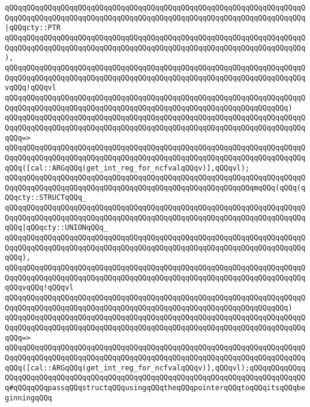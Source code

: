 \verb|qQQqqQQqqQQqqQQqqQQqqQQqqQQqqQQqqQQqqQQqqQQqqQQqqQQqqQQqqQQqqQQqqQQqqQQqqQQqqQQqqQQqqQQqqQQqqQQqqQQqqQQqqQQqqQQqqQQqqQQqqQQqqQQqqQQqqQQqqQQq|\verb#|qQQqcty::PTR#\newline
\verb|qQQqqQQqqQQqqQQqqQQqqQQqqQQqqQQqqQQqqQQqqQQqqQQqqQQqqQQqqQQqqQQqqQQqqQQqqQQqqQQqqQQqqQQqqQQqqQQqqQQqqQQqqQQqqQQqqQQqqQQqqQQqqQQqqQQqqQQqqQQq),|\newline
\verb|qQQqqQQqqQQqqQQqqQQqqQQqqQQqqQQqqQQqqQQqqQQqqQQqqQQqqQQqqQQqqQQqqQQqqQQqqQQqqQQqqQQqqQQqqQQqqQQqqQQqqQQqqQQqqQQqqQQqqQQqqQQqqQQqqQQqqQQqqQQqvqQQq!qQQqvl|\newline
\verb|qQQqqQQqqQQqqQQqqQQqqQQqqQQqqQQqqQQqqQQqqQQqqQQqqQQqqQQqqQQqqQQqqQQqqQQqqQQqqQQqqQQqqQQqqQQqqQQqqQQqqQQqqQQqqQQqqQQqqQQqqQQqqQQqqQQqqQQq)|\newline
\verb|qQQqqQQqqQQqqQQqqQQqqQQqqQQqqQQqqQQqqQQqqQQqqQQqqQQqqQQqqQQqqQQqqQQqqQQqqQQqqQQqqQQqqQQqqQQqqQQqqQQqqQQqqQQqqQQqqQQqqQQqqQQqqQQqqQQqqQQqqQQqqQQq=>|\newline
\verb|qQQqqQQqqQQqqQQqqQQqqQQqqQQqqQQqqQQqqQQqqQQqqQQqqQQqqQQqqQQqqQQqqQQqqQQqqQQqqQQqqQQqqQQqqQQqqQQqqQQqqQQqqQQqqQQqqQQqqQQqqQQqqQQqqQQqqQQqqQQqqQQq([cal::ARGqQQq(get_int_reg_for_ncfvalqQQqv)],qQQqvl);|\newline
\newline
\verb|qQQqqQQqqQQqqQQqqQQqqQQqqQQqqQQqqQQqqQQqqQQqqQQqqQQqqQQqqQQqqQQqqQQqqQQqqQQqqQQqqQQqqQQqqQQqqQQqqQQqqQQqqQQqqQQqqQQqqQQqqQQqqQQqmqQQq(qQQq(qQQqcty::STRUCTqQQq_|\newline
\verb|qQQqqQQqqQQqqQQqqQQqqQQqqQQqqQQqqQQqqQQqqQQqqQQqqQQqqQQqqQQqqQQqqQQqqQQqqQQqqQQqqQQqqQQqqQQqqQQqqQQqqQQqqQQqqQQqqQQqqQQqqQQqqQQqqQQqqQQqqQQqqQQq|\verb#|qQQqcty::UNIONqQQq_#\newline
\verb|qQQqqQQqqQQqqQQqqQQqqQQqqQQqqQQqqQQqqQQqqQQqqQQqqQQqqQQqqQQqqQQqqQQqqQQqqQQqqQQqqQQqqQQqqQQqqQQqqQQqqQQqqQQqqQQqqQQqqQQqqQQqqQQqqQQqqQQqqQQqqQQq),|\newline
\verb|qQQqqQQqqQQqqQQqqQQqqQQqqQQqqQQqqQQqqQQqqQQqqQQqqQQqqQQqqQQqqQQqqQQqqQQqqQQqqQQqqQQqqQQqqQQqqQQqqQQqqQQqqQQqqQQqqQQqqQQqqQQqqQQqqQQqqQQqqQQqqQQqvqQQq!qQQqvl|\newline
\verb|qQQqqQQqqQQqqQQqqQQqqQQqqQQqqQQqqQQqqQQqqQQqqQQqqQQqqQQqqQQqqQQqqQQqqQQqqQQqqQQqqQQqqQQqqQQqqQQqqQQqqQQqqQQqqQQqqQQqqQQqqQQqqQQqqQQqqQQq)|\newline
\verb|qQQqqQQqqQQqqQQqqQQqqQQqqQQqqQQqqQQqqQQqqQQqqQQqqQQqqQQqqQQqqQQqqQQqqQQqqQQqqQQqqQQqqQQqqQQqqQQqqQQqqQQqqQQqqQQqqQQqqQQqqQQqqQQqqQQqqQQqqQQqqQQq=>|\newline
\verb|qQQqqQQqqQQqqQQqqQQqqQQqqQQqqQQqqQQqqQQqqQQqqQQqqQQqqQQqqQQqqQQqqQQqqQQqqQQqqQQqqQQqqQQqqQQqqQQqqQQqqQQqqQQqqQQqqQQqqQQqqQQqqQQqqQQqqQQqqQQqqQQq([cal::ARGqQQq(get_int_reg_for_ncfvalqQQqv)],qQQqvl);qQQqqQQqqQQqqQQqqQQqqQQqqQQqqQQqqQQqqQQqqQQqqQQqqQQqqQQqqQQqqQQqqQQqqQQqqQQqqQQqqQQq#qQQqqQQqpassqQQqstructqQQqusingqQQqtheqQQqpointerqQQqtoqQQqitsqQQqbeginningqQQq|\newline
